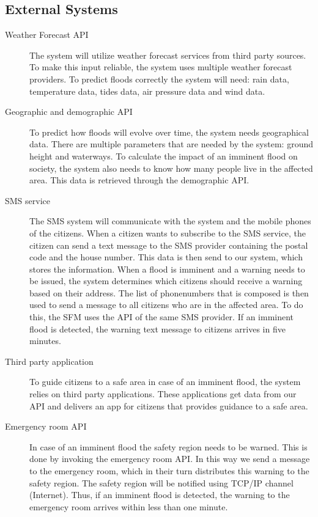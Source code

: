 \subsection{External Systems}
\label{subsec:external-system}
\begin{description}
	\item[Weather Forecast API] The system will utilize weather forecast services from third party sources. To make this input reliable, the system uses multiple weather forecast providers. To predict floods correctly the system will need: rain data, temperature data, tides data, air pressure data and wind data.
	\item[Geographic and demographic API] To predict how floods will evolve over time, the system needs geographical data. There are multiple parameters that are needed by the system: ground height and waterways. To calculate the impact of an imminent flood on society, the system also needs to know how many people live in the affected area. This data is retrieved through the demographic API.
	\item[SMS service] The SMS system will communicate with the system and the mobile phones of the citizens. When a citizen wants to subscribe to the SMS service, the citizen can send a text message to the SMS provider containing the postal code and the house number. This data is then send to our system, which stores the information. When a flood is imminent and a warning needs to be issued, the system determines which citizens should receive a warning based on their address. The list of phonenumbers that is composed is then used to send a message to all citizens who are in the affected area. To do this, the SFM uses the API of the same SMS provider. If an imminent flood is detected, the warning text message to citizens arrives in five minutes.
	\item[Third party application] To guide citizens to a safe area in case of an imminent flood, the system relies on third party applications. These applications get data from our API and delivers an app for citizens that provides guidance to a safe area.
	\item[Emergency room API] In case of an imminent flood the safety region needs to be warned. This is done by invoking the emergency room API. In this way we send a message to the emergency room, which in their turn distributes this warning to the safety region. The safety region will be notified using TCP/IP channel (Internet). Thus, if an imminent flood is detected, the warning to the emergency room arrives within less than one minute.
\end{description}

